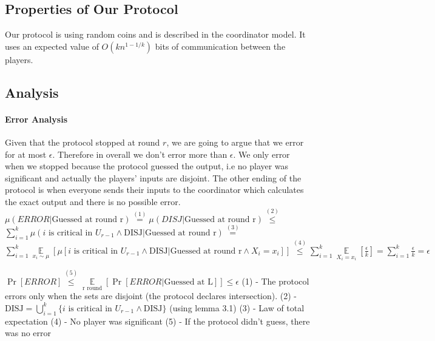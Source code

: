 \documentclass{article}
\theoremstyle{plain}
\begin{document}
\subsection{Properties of Our Protocol}
Our protocol is using random coins and is described in the coordinator model. It uses an expected value of $O(kn^{1-1/k})$ bits of communication between the players.
\subsection{Analysis}
\paragraph{Error Analysis}
Given that the protocol stopped at round $r$, we are going to argue that we error for at most $\epsilon$. Therefore in overall we don't error more than $\epsilon$.
We only error when we stopped because the protocol guessed the output, i.e no player was significant and actually the players' inputs are disjoint. The other ending of the protocol is when everyone sends their inputs to the coordinator which calculates the exact output and there is no possible error. \newline
$\mu(ERROR | \text{Guessed at round r}) \overset{(1)}{=} \mu(DISJ | \text{Guessed at round r}) \overset{(2)}{\leq} $\newline
$\sum\limits_{i=1}^k \mu(\text{$i$ is critical in $U_{r-1}$} \land \text{DISJ}| \text{Guessed at round r}) \overset{(3)}{=} $ \newline
$\sum\limits_{i=1}^k \underset{x_i \sim \mu}{\mathop{\mathbb{E}}}[\mu[\text{$i$ is critical in $U_{r-1}$} \land \text{DISJ}| \text{Guessed at round r} \land X_i=x_i]] \overset{(4)}{\leq} \sum\limits_{i=1}^k \underset{X_i=x_i}{\mathop{\mathbb{E}}}[\frac{\epsilon}{k}] = \sum\limits_{i=1}^k \frac{\epsilon}{k} = \epsilon$ \newline

$\Pr[ERROR] \overset{(5)}{\leq} \underset{\text{r round}}{\mathop{\mathbb{E}}} [\Pr[ERROR | \text{Guessed at L}] ] \leq \epsilon $ \newline
(1) - The protocol errors only when the sets are disjoint (the protocol declares intersection). \newline
(2) - $  \text{DISJ} = \bigcup_{i=1}^{k}\{\text{$i$ is critical in $U_{r-1}$} \land \text{DISJ} \} $ (using lemma 3.1) \newline
(3) - Law of total expectation \newline
(4) - No player was significant \newline
(5) - If the protocol didn't guess, there was no error
\end{document}
